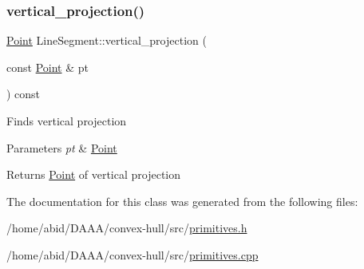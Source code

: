 \subsubsection{\texorpdfstring{vertical\_projection()}{vertical\_projection()}}
{\footnotesize\ttfamily \mbox{\hyperlink{class_point}{Point}} Line\+Segment\+::vertical\+\_\+projection (\begin{DoxyParamCaption}\item[{const \mbox{\hyperlink{class_point}{Point}} \&}]{pt }\end{DoxyParamCaption}) const}

Finds vertical projection 
\begin{DoxyParams}{Parameters}
{\em pt} & \mbox{\hyperlink{class_point}{Point}} \\
\hline
\end{DoxyParams}
\begin{DoxyReturn}{Returns}
\mbox{\hyperlink{class_point}{Point}} of vertical projection 
\end{DoxyReturn}


The documentation for this class was generated from the following files\+:\begin{DoxyCompactItemize}
\item 
/home/abid/\+D\+A\+A\+A/convex-\/hull/src/\mbox{\hyperlink{primitives_8h}{primitives.\+h}}\item 
/home/abid/\+D\+A\+A\+A/convex-\/hull/src/\mbox{\hyperlink{primitives_8cpp}{primitives.\+cpp}}\end{DoxyCompactItemize}
